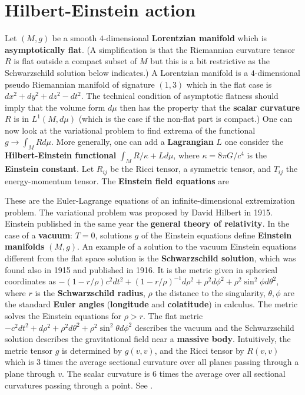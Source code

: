 \documentclass[12pt]{amsart}
\def\satz#1{ \vspace{2mm} \begin{center} \fcolorbox{yellow1}{yellow1}{ \parbox{14.0cm}{{\bf Theorem:} #1}} \vspace{2mm} \end{center} }
\newcounter{example}    \def\example#1{ \item \fontsize{12}{15} \selectfont #1 \fontsize{12}{15} \selectfont }
\begin{document}
\section{Hilbert-Einstein action}

Let $(M,g)$ be a smooth $4$-dimensional {\bf Lorentzian manifold} which is {\bf asymptotically flat}. 
(A simplification is that the Riemannian curvature tensor $R$ is flat outside a compact subset of $M$
but this is a bit restrictive as the Schwarzschild solution below indicates.)
A Lorentzian manifold is a $4$-dimensional pseudo Riemannian
manifold of signature $(1,3)$ which in the flat case is
$dx^2+dy^2+dz^2-dt^2$. The technical condition of asymptotic flatness should imply
that the volume form $d\mu$ then has
the property that the {\bf scalar curvature} $R$ is in $L^1(M,d\mu)$ (which is the case if the non-flat
part is compact.) One can now look
at the variational problem to find extrema of the functional $g \to \int_M R d\mu$.
More generally, one can add a {\bf Lagrangian} $L$
one consider the {\bf Hilbert-Einstein functional} $\int_M  R/\kappa + L d\mu$,
where $\kappa = 8\pi G/c^4$ is the {\bf Einstein constant}.
Let $R_{ij}$ be the Ricci tensor, a symmetric tensor,
and $T_{ij}$ the energy-momentum tensor. The {\bf Einstein field equations} are

\satz{$G_{ij} =  R_{ij} - g_{ij} R/2 = \kappa T_{ij}$.}

These are the Euler-Lagrange equations of an infinite-dimensional
extremization problem. The variational problem was proposed by
David Hilbert in 1915. Einstein published in the same year
the {\bf general theory of relativity}. In the case of a {\bf vacuum}: $T=0$,
solutions $g$ of the Einstein equations define {\bf Einstein manifolds} $(M,g)$. An example of a
solution to the vacuum Einstein equations different from the flat space solution is
the {\bf Schwarzschild solution}, which was found also in 1915 and published in 1916.
It is the metric given in spherical coordinates as
$-(1-r/\rho) c^2 dt^2+(1-r/\rho)^{-1} d\rho^2 + \rho^2 d\phi^2+\rho^2 \sin^2\phi d\theta^2$,
where $r$ is the {\bf Schwarzschild radius}, $\rho$ the distance to the singularity, $\theta,\phi$
are the standard {\bf Euler angles} ({\bf longitude} and {\bf colatitude}) in calculus. The metric solves the
Einstein equations for $\rho>r$.
The flat metric $-c^2 dt^2+d\rho^2+\rho^2 d\theta^2+\rho^2 \sin^2\theta d\phi^2$ describes
the vacuum and the Schwarzschild solution describes the gravitational field near a
{\bf massive body}. Intuitively, the metric tensor $g$ is determined by $g(v,v)$,
and the Ricci tensor by $R(v,v)$ which is 3 times the average
sectional curvature over all planes passing through a plane
through $v$. The scalar curvature is 6 times the average over
all sectional curvatures passing through a point.
See \cite{Misner,Ciu95}.
\end{document}
